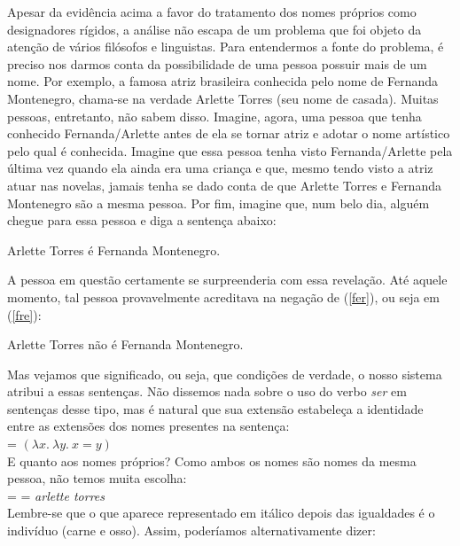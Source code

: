 Apesar da evidência acima a favor do tratamento dos nomes próprios
como designadores rígidos, a análise não escapa de um problema que
foi objeto da atenção de vários filósofos e linguistas. Para
entendermos a fonte do problema, é preciso nos darmos conta da
possibilidade de uma pessoa possuir mais de um nome. Por exemplo,
a famosa atriz brasileira conhecida pelo nome de Fernanda
Montenegro, chama-se na verdade Arlette Torres (seu nome de
casada). Muitas pessoas, entretanto, não sabem disso. Imagine,
agora, uma pessoa que tenha conhecido Fernanda/Arlette antes de ela
se tornar atriz e adotar o nome artístico pelo qual é conhecida.
Imagine que essa pessoa tenha visto Fernanda/Arlette pela última
vez quando ela ainda era uma criança e que, mesmo tendo visto a atriz atuar nas novelas, jamais tenha se dado conta de que Arlette Torres e
Fernanda Montenegro são a mesma pessoa. Por fim, imagine que, num
belo dia, alguém chegue para essa pessoa e diga a sentença abaixo:

\begin{exe}
\ex Arlette Torres é Fernanda Montenegro.\label{fer}
\end{exe}

\n A pessoa em questão certamente se surpreenderia com essa
revelação. Até aquele momento, tal pessoa provavelmente acreditava
na negação de (\ref{fer}), ou seja em (\ref{fre}):

\begin{exe}
\ex Arlette Torres não é Fernanda Montenegro.\label{fre}
\end{exe}

Mas vejamos que significado, ou seja, que condições de verdade, o
nosso sistema atribui a essas sentenças. Não dissemos nada sobre o
uso do verbo \textit{ser} em sentenças desse tipo, mas é natural
que sua extensão estabeleça a identidade entre as extensões dos
nomes presentes na sentença:\\

\n{} = $(\lambda x.\ \lambda y.\ x = y)$\\

\n E quanto aos nomes próprios? Como ambos os nomes são nomes da
mesma pessoa, não temos muita escolha:\\

\n{} =  = \textit{arlette torres}\\

\n Lembre-se que o que aparece representado em itálico depois das igualdades é o indivíduo
(carne e osso). Assim, poderíamos alternativamente dizer:\\

